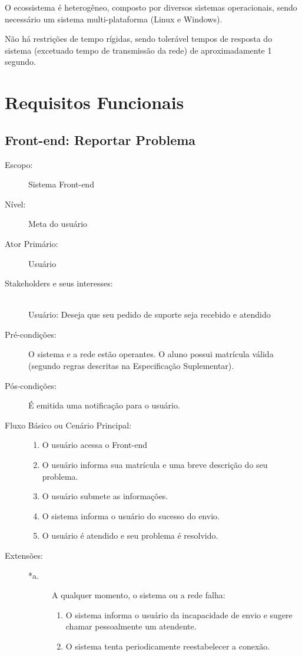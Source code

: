 \documentclass[brazil,times]{abnt}
\begin{document}
O ecossistema é heterogêneo, composto por diversos sistemas operacionais, sendo
necessário um sistema multi-plataforma (Linux e Windows).

Não há restrições de tempo rígidas, sendo tolerável tempos de resposta do
sistema (excetuado tempo de transmissão da rede) de aproximadamente 1 segundo.

\chapter{Requisitos Funcionais}
\section{Front-end: Reportar Problema}
\begin{description}
\item[Escopo:] Sistema Front-end
\item[Nível:] Meta do usuário
\item[Ator Primário:] Usuário

\item[Stakeholders e seus interesses:] \hfill \\ 
Usuário: Deseja que seu pedido de suporte seja recebido e atendido

\item[Pré-condições:] O sistema e a rede estão operantes. O aluno possui
matrícula válida (segundo regras descritas na Especificação Suplementar).

\item[Pós-condições:] É emitida uma notificação para o usuário.

\item[Fluxo Básico ou Cenário Principal:] \hfill
\begin{enumerate}
  \item O usuário acessa o Front-end
  \item O usuário informa sua matrícula e uma breve descrição do seu problema.
  \item O usuário submete as informações.
  \item O sistema informa o usuário do sucesso do envio.
  \item O usuário é atendido e seu problema é resolvido.
\end{enumerate}

\item[Extensões:] \hfill
\begin{description}
	\item[*a.] A qualquer momento, o sistema ou a rede falha:
		\begin{enumerate}
 			\item O sistema informa o usuário da incapacidade de envio e sugere chamar    
  			pessoalmente um atendente.
  			\item  O sistema tenta periodicamente reestabelecer a conexão.
		\end{enumerate}


\end{description}
\end{description}
\end{document}

